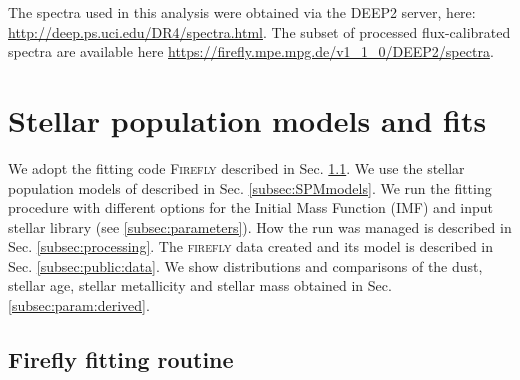 \documentclass[onecolumn]{aa}
\begin{document}
The spectra used in this analysis were obtained via the DEEP2 server, here: \url{http://deep.ps.uci.edu/DR4/spectra.html}. 
The subset of processed flux-calibrated spectra are available here \url{https://firefly.mpe.mpg.de/v1_1_0/DEEP2/spectra}. 

\clearpage
\section{Stellar population models and fits}
\label{sec:SPS}

We adopt the fitting code \textsc{Firefly} \citep{firefly2017MNRAS} described in Sec. \ref{subsec:firefly}.
We use the stellar population models of \citet{Maraston_2011} described in Sec. \ref{subsec:SPMmodels}.
We run the fitting procedure with different options for the Initial Mass Function (IMF) and input stellar library (see \ref{subsec:parameters}).
How the run was managed is described in Sec. \ref{subsec:processing}. 
The \textsc{firefly} data created and its model is described in Sec. \ref{subsec:public:data}.
We show distributions and comparisons of the dust, stellar age, stellar metallicity and stellar mass obtained in Sec. \ref{subsec:param:derived}.


\subsection{Firefly fitting routine}
\label{subsec:firefly}
\end{document}

